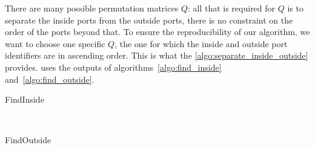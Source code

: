 There are many possible permutation matrices $Q$: all that is required for $Q$ is to separate the inside ports from the outside ports, there is no constraint on the order of the ports beyond that.
To ensure the reproducibility of our algorithm, we want to choose one specific $Q$, the one for which the inside and outside port identifiers are in ascending order.
This is what the \cref{algo:separate_inside_outside} provides.
 uses the outputs of algorithms~\ref{algo:find_inside} and~\ref{algo:find_outside}.

\begin{algorithm}
    \caption{FindInside}
    \label{algo:find_inside}
    \begin{algorithmic}
         
        \EndFor
        \\  
        \EndFunction
    \end{algorithmic}
\end{algorithm}

\begin{algorithm}
    \caption{FindOutside}
    \label{algo:find_outside}
    \begin{algorithmic}
         
         
        \\  
        \EndFunction
    \end{algorithmic}
\end{algorithm}

